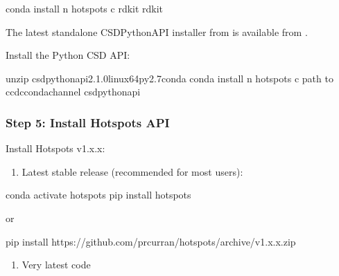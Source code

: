 \documentclass[letterpaper,10pt,english]{sphinxmanual}
\begin{document}
\begin{sphinxVerbatim}[commandchars=\\\{\}]
conda install \PYGZhy{}n hotspots \PYGZhy{}c rdkit rdkit
\end{sphinxVerbatim}

The latest standalone CSD\sphinxhyphen{}Python\sphinxhyphen{}API installer from is available from .

Install the Python CSD API:

\begin{sphinxVerbatim}[commandchars=\\\{\}]
unzip csd\PYGZhy{}python\PYGZhy{}api\PYGZhy{}2.1.0\PYGZhy{}linux\PYGZhy{}64\PYGZhy{}py2.7\PYGZhy{}conda
conda install \PYGZhy{}n hotspots \PYGZhy{}c \PYGZlt{}path to ccdc\PYGZus{}conda\PYGZus{}channel\PYGZgt{} csd\PYGZhy{}python\PYGZhy{}api
\end{sphinxVerbatim}


\subsubsection{Step 5: Install Hotspots API}
\label{\detokenize{tutorial:step-5-install-hotspots-api}}
Install Hotspots v1.x.x:
\begin{enumerate}
%
\item {} 
Latest stable release (recommended for most users):

\end{enumerate}

\begin{sphinxVerbatim}[commandchars=\\\{\}]
conda activate hotspots
pip install hotspots
\end{sphinxVerbatim}

or

\begin{sphinxVerbatim}[commandchars=\\\{\}]
pip install https://github.com/prcurran/hotspots/archive/v1.x.x.zip
\end{sphinxVerbatim}
\begin{enumerate}
%
\setcounter{enumi}{1}
\item {} 
Very latest code

\end{enumerate}
\end{document}
